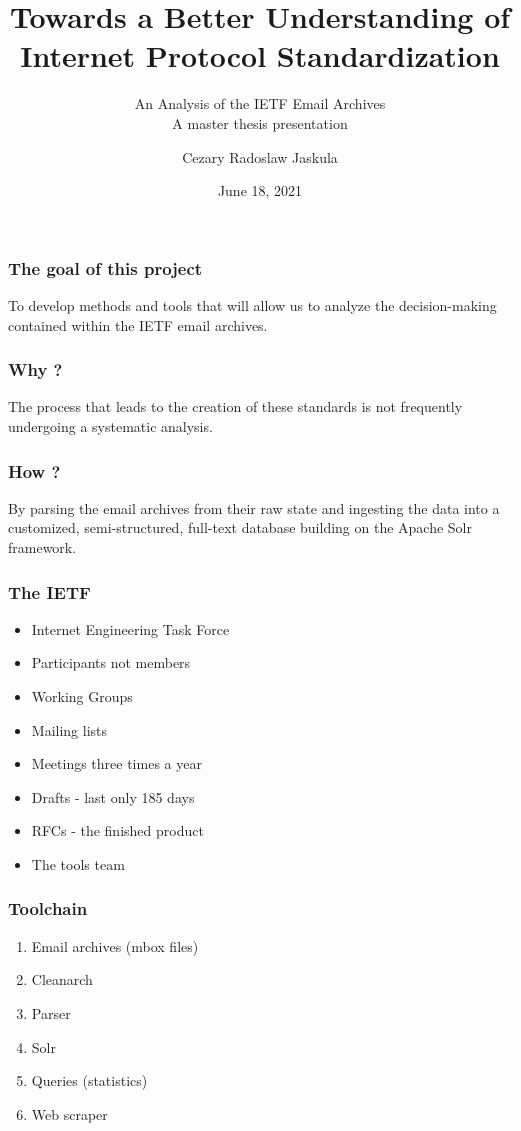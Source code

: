 \documentclass{beamer}
\title{\textbf{Towards a Better Understanding of Internet Protocol Standardization}}
\subtitle{An Analysis of the IETF Email Archives\\A master thesis presentation}
\author{Cezary Radoslaw Jaskula}
\institute{University of Oslo}
\date{June 18, 2021}
\begin{document}
\frame{\titlepage}



\begin{frame}
\frametitle{The goal of this project }
To develop methods and tools that will allow us to analyze the decision-making contained within the IETF email archives.\\
\bigskip


\end{frame}


\begin{frame}
\frametitle{Why ?}

The process that leads to the creation of these standards is not frequently undergoing a systematic analysis. 


\end{frame}


\begin{frame}
\frametitle{How ?}
By parsing the email archives from their raw state and ingesting the data into a customized, semi-structured, full-text database building on the Apache Solr framework. 

\end{frame}





\begin{frame}
\frametitle{The IETF}

\begin{itemize}

\item Internet Engineering Task Force
\item Participants not members
\item Working Groups
\item Mailing lists
\item Meetings three times a year
\item Drafts - last only 185 days
\item RFCs - the finished product

\item The tools team


\end{itemize}

\end{frame}


\begin{frame}
\frametitle{Toolchain}
    \begin{enumerate}
    \item Email archives (mbox files)
\item Cleanarch 
\item Parser
\item Solr 
\item Queries (statistics)
\item Web scraper
    \end{enumerate}
\end{frame}
\end{document}
